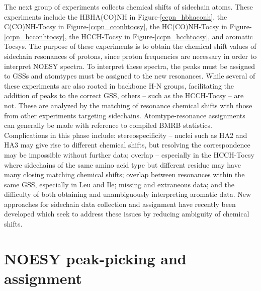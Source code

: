 The next group of experiments collects chemical shifts of sidechain atoms.  
These experiments include 
the HBHA(CO)NH \cite{hbhaconh} in Figure-\ref{ccpn_hbhaconh}, 
the C(CO)NH-Tocsy \cite{cconhtocsy} in Figure-\ref{ccpn_cconhtocsy}, 
the HC(CO)NH-Tocsy \cite{hcconhtocsy} in Figure-\ref{ccpn_hcconhtocsy}, 
the HCCH-Tocsy \cite{hcchtocsy} in Figure-\ref{ccpn_hcchtocsy}, 
and aromatic Tocsys.  The purpose of these experiments is to 
obtain the chemical shift values of sidechain resonances of protons, since 
proton frequencies are necessary in order to interpret NOESY spectra.  To 
interpret these spectra, the peaks must be assigned to GSSs and atomtypes 
must be assigned to the new resonances. While several of these experiments 
are also rooted in backbone H-N groups, facilitating the addition of peaks 
to the correct GSS, others -- such as the HCCH-Tocsy -- are not.  These are 
analyzed by the matching of resonance chemical shifts with those from other 
experiments targeting sidechains.  Atomtype-resonance assignments can generally 
be made with reference to compiled BMRB statistics.  Complications in this 
phase include: stereospecificity -- nuclei such as HA2 and HA3 may give rise 
to different chemical shifts, but resolving the correspondence may be 
impossible without further data; overlap -- especially in the HCCH-Tocsy 
where sidechains of the same amino acid type but different residue may have 
many closing matching chemical shifts; overlap between resonances within the 
same GSS, especially in Leu and Ile; missing and extraneous data; and the 
difficulty of both obtaining and unambiguously interpreting aromatic data.  
New approaches for sidechain data collection and assignment have recently 
been developed \cite{mobli2010non, hiller2008apsy} which seek to address 
these issues by reducing ambiguity of chemical shifts.


\section{NOESY peak-picking and assignment}

